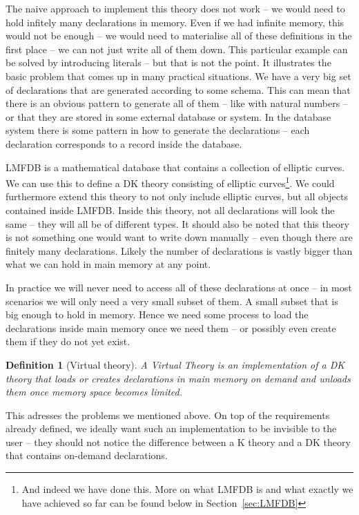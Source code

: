 \documentclass{deliverablereport}
\newtheorem{mydef}{Definition}
\begin{document}
The naive approach to implement this theory does not work -- we would need to hold infitely many declarations in memory. Even if we had infinite memory, this would not be enough -- we would need to materialise all of these definitions in the first place -- we can not just write all of them down. This particular example can be solved by introducing literals -- but that is not the point. It illustrates the basic problem that comes up in many practical situations. We have a very big set of declarations that are generated according to some schema. This can mean that there is an obvious pattern to generate all of them -- like with natural numbers -- or that they are stored in some external database or system. In the database system there is some pattern in how to generate the declarations -- each declaration corresponds to a record inside the database.

LMFDB is a mathematical database that contains a collection of elliptic curves. We can use this to define a DK theory consisting of elliptic curves\footnote{And indeed we have done this. More on what LMFDB is and what exactly we have achieved so far can be found below in Section~\ref{sec:LMFDB}}. We could furthermore extend this theory to not only include elliptic curves, but all objects contained inside LMFDB. Inside this theory, not all declarations will look the same -- they will all be of different types. It should also be noted that this theory is not something one would want to write down manually -- even though there are finitely many declarations. Likely the number of declarations is vastly bigger than what we can hold in main memory at any point.

In practice we will never need to access all of these declarations at once -- in most scenarios we will only need a very small subset of them. A small subset that is big enough to hold in memory. Hence we need some process to load the declarations inside main memory once we need them -- or possibly even create them if they do not yet exist.
\begin{mydef}[Virtual theory]
  A Virtual Theory is an implementation of a DK theory that loads or creates declarations in main memory on demand and unloads them once memory space becomes limited.
\end{mydef}
This adresses the problems we mentioned above. On top of the requirements already defined, we ideally want such an implementation to be invisible to the user -- they should not notice the difference between a K theory and a DK theory that contains on-demand declarations.
\end{document}
